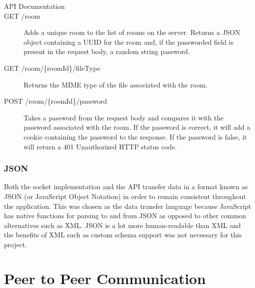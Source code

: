 \documentclass[]{report}
\begin{document}
				\begin{description}
					\item [API Documentation]
				
					\item[GET /room] 
					Adds a unique room to the list of rooms on the server. Returns a JSON object containing a UUID for the room and, if the passworded field is present in the request body, a random string password.
						
					\item[GET /room/\{roomId\}/fileType] 
					Returns the MIME type of the file associated with the room.
					
					\item[POST /room/\{roomId\}/password] 
					Takes a password from the request body and compares it with the password associated with the room. If the password is correct, it will add a cookie containing the password to the response. If the password is false, it will return a 401 Unauthorized HTTP status code.
					
				\end{description}
				
				\subsubsection{JSON}
				Both the socket implementation and the API transfer data in a format known as JSON (or JavaScript Object Notation) in order to remain consistent throughout the application. This was chosen as the data transfer language because JavaScript has native functions for parsing to and from JSON as opposed to other common alternatives such as XML. JSON is a lot more human-readable than XML and the benefits of XML such as custom schema support was not necessary for this project.
		
		\section{Peer to Peer Communication}
\end{document}
